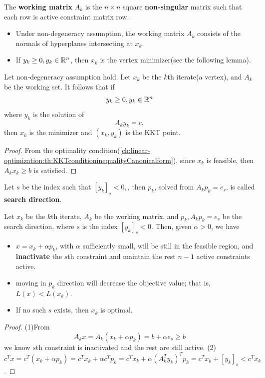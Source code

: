 \begin{refsection}
\begin{definition}
	The \textbf{working matrix} $A_k$ is the $n \times n$ square \textbf{non-singular} matrix such that each row is active constraint matrix row.
\end{definition}

\begin{remark}\hfill
	\begin{itemize}
		\item Under non-degeneracy assumption, the working matrix $A_k$ consists of the normals of hyperplanes intersecting at $x_k$. 
		\item If $y_k \geq 0, y_k\in \mathbb{R}^n$, then $x_k$ is the vertex minimizer(see the following lemma).
	\end{itemize}
\end{remark}

\begin{lemma}
	Let non-degeneracy assumption hold. Let $x_k$ be the $k$th iterate(a vertex), and $A_k$ be the working set. It follows that if
	$$y_k \geq 0, y_k \in \mathbb{R}^n$$
	where $y_k$ is the solution of
	$$A_k y_k = c,$$
	then 
	$x_k$ is the minimizer and $(x_k,y_k)$ is the KKT point. 	
\end{lemma}
\begin{proof}
	From the optimality condition(\autoref{ch:linear-optimization:th:KKTconditioninequalityCanonicalform}), since $x_k$ is feasible, then $A_kx_k\geq b$ is satisfied. 
\end{proof}


\begin{definition}
	Let $s$ be the index such that $[y_k]_s < 0,$, then  $p_k$, solved from $A_kp_k = e_s$, is called \textbf{search direction}. 	
\end{definition}


\begin{lemma}\label{ch:linear-optimization:th:simplexAlgorithmSearchDirectionProperty}
	Let $x_k$ be the $k$th iterate, $A_k$ be the working matrix, and $p_k, A_kp_k = e_s$ be the search direction, where $s$ is the index $[y_k]_s < 0$. Then, given $\alpha > 0$, we have
	\begin{itemize}
		\item $x = x_k + \alpha p_k$, with $\alpha$ sufficiently small, will be still in the feasible region, and \textbf{inactivate} the $s$th constraint and maintain the rest $n-1$ active constraints active. 
		\item moving in $p_k$ direction will decrease the objective value; that is, $L(x) < L(x_k)$.
		\item If no such $s$ exists, then $x_k$ is optimal.
	\end{itemize}
\end{lemma}
\begin{proof}
	(1)From
	$$A_k x = A_k (x_k + \alpha p_k) = b + \alpha e_s \geq b$$
	we know $s$th constraint is inactivated and the rest are still active.
	(2) $c^Tx = c^T(x_k + \alpha p_k) = c^Tx_k + \alpha c^Tp_k = c^Tx_k + \alpha (A_k^Ty_k)^Tp_k = c^Tx_k + [y_k]_s <c^Tx_k$.	
\end{proof}



\end{refsection}
